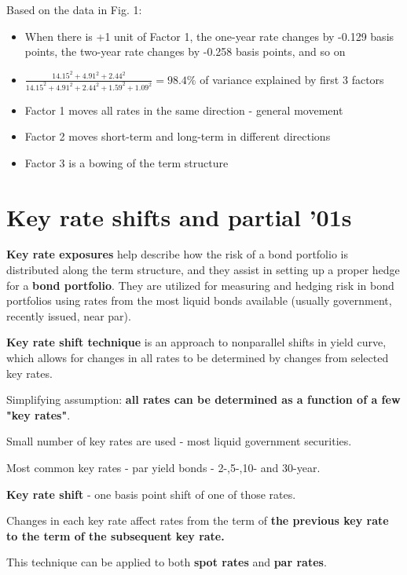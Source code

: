 \documentclass{article}
\begin{document}
Based on the data in Fig. 1:
\begin{itemize}
    \item When there is +1 unit of Factor 1, the one-year rate changes by -0.129 basis points, the two-year rate changes by -0.258 basis points, and so on

    \item $\frac{14.15^2 + 4.91^2 + 2.44^2}{14.15^2 + 4.91^2 + 2.44^2 + 1.59^2 + 1.09^2} = 98.4\%$ of variance explained by first 3 factors

    \item Factor 1 moves all rates in the same direction - general movement

    \item Factor 2 moves short-term and long-term in different directions

    \item Factor 3 is a bowing of the term structure
\end{itemize}


\section{Key rate shifts and partial '01s}

\textbf{Key rate exposures} help describe how the risk of a bond portfolio is distributed along the term structure, and they assist in setting up a proper hedge for a \textbf{bond portfolio}.
They are utilized for measuring and hedging risk in bond portfolios using rates from the most liquid bonds available (usually government, recently issued, near par).

\textbf{Key rate shift technique} is an approach to nonparallel shifts in yield curve, which allows for changes in all rates to be determined by changes from selected key rates.

Simplifying assumption: \textbf{all rates can be determined as a function of a few "key rates"}.

Small number of key rates are used - most liquid government securities.

Most common key rates - par yield bonds - 2-,5-,10- and 30-year.

\textbf{Key rate shift} - one basis point shift of one of those rates.

Changes in each key rate affect rates from the term of \textbf{the previous key rate to the term of the subsequent key rate.}

This technique can be applied to both \textbf{spot rates} and \textbf{par rates}.
\end{document}
